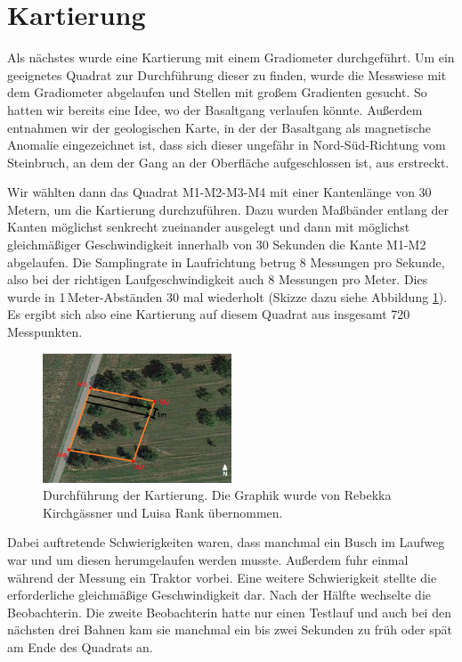 \section{Kartierung}

Als nächstes wurde eine Kartierung mit einem Gradiometer durchgeführt. Um ein geeignetes Quadrat zur Durchführung dieser zu finden, wurde die Messwiese mit dem Gradiometer abgelaufen und Stellen mit großem Gradienten gesucht. So hatten wir bereits eine Idee, wo der Basaltgang verlaufen könnte. Außerdem entnahmen wir der geologischen Karte, in der der Basaltgang als magnetische Anomalie eingezeichnet ist, dass sich dieser ungefähr in Nord-Süd-Richtung vom Steinbruch, an dem der Gang an der Oberfläche aufgeschlossen ist, aus erstreckt.

Wir wählten dann das Quadrat M1-M2-M3-M4 mit einer Kantenlänge von 30 Metern, um die Kartierung durchzuführen. Dazu wurden Maßbänder entlang der Kanten möglichst senkrecht zueinander ausgelegt und dann mit möglichst gleichmäßiger Geschwindigkeit innerhalb von 30 Sekunden die Kante M1-M2 abgelaufen. Die Samplingrate in Laufrichtung betrug 8 Messungen pro Sekunde, also bei der richtigen Laufgeschwindigkeit auch 8 Messungen pro Meter. Dies wurde in 1\,Meter-Abständen 30 mal wiederholt (Skizze dazu siehe Abbildung \ref{fig:MessungKartierung}). Es ergibt sich also eine Kartierung auf diesem Quadrat aus insgesamt 720 Messpunkten.

\begin{figure}[!ht]
 \centering
 \includegraphics[width=0.5\textwidth]{fig/Kartierunggps}
 \caption[Durchführung der Kartierung]{Durchführung der Kartierung. Die Graphik wurde von Rebekka Kirchgässner und Luisa Rank übernommen.}
 \label{fig:MessungKartierung}
\end{figure}

Dabei auftretende Schwierigkeiten waren, dass manchmal ein Busch im Laufweg war und um diesen herumgelaufen werden musste. Außerdem fuhr einmal während der Messung ein Traktor vorbei. Eine weitere Schwierigkeit stellte die erforderliche gleichmäßige Geschwindigkeit dar. Nach der Hälfte wechselte die Beobachterin. Die zweite Beobachterin hatte nur einen Testlauf und auch bei den nächsten drei Bahnen kam sie manchmal ein bis zwei Sekunden zu früh oder spät am Ende des Quadrats an.


